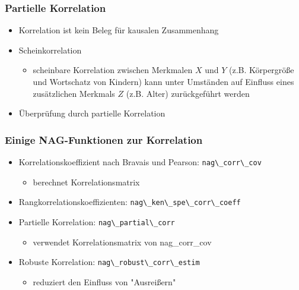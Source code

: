 \documentclass{beamer}
\begin{document}
\begin{frame}
	
	\frametitle{Partielle Korrelation}
	
	\begin{itemize}
		
		\item Korrelation ist kein Beleg f\"ur kausalen Zusammenhang
		
		\item Scheinkorrelation
		\begin{itemize}
			\item scheinbare Korrelation zwischen Merkmalen $X$ und $Y$ (z.B. K\"orpergr\"o\ss e und Wortschatz von Kindern) kann unter Umst\"anden auf Einfluss eines zus\"atzlichen Merkmals $Z$ (z.B. Alter) zur\"uckgef\"uhrt werden
		\end{itemize}
		
		\item \"Uberpr\"ufung durch partielle Korrelation
		
	\end{itemize}
	
\end{frame}

\begin{frame}

	\frametitle{Einige NAG-Funktionen zur Korrelation}
 
	\begin{itemize}

		\item \alert<2>{Korrelationskoeffizient nach Bravais und Pearson: \hfill \lstinline{nag\_corr\_cov}}
		\begin{itemize}
			\item berechnet Korrelationsmatrix
		\end{itemize}
		
		\item \alert<2>{Rangkorrelationskoeffizienten: \hfill \lstinline{nag\_ken\_spe\_corr\_coeff}}

		\item \alert<2>{Partielle Korrelation: \hfill \lstinline{nag\_partial\_corr}}
		\begin{itemize}
			\item verwendet Korrelationsmatrix von nag\_corr\_cov
		\end{itemize}
		
		\item Robuste Korrelation: \hfill \lstinline{nag\_robust\_corr\_estim}
		\begin{itemize}
			\item reduziert den Einfluss von "Ausrei\ss ern"
		\end{itemize}

	\end{itemize}

\end{frame}
\end{document}
